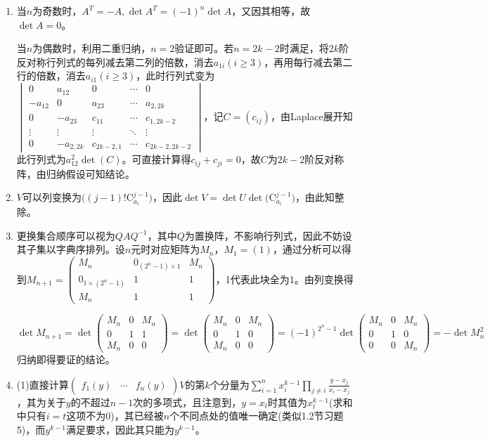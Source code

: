 \documentclass[a4paper,UTF8,fontset=windows]{ctexart}
\begin{document}
\begin{enumerate}
\item
当$n$为奇数时，$A^T=-A,\det{A^T}=(-1)^n\det{A}$，又因其相等，故$\det{A}=0$。

当$n$为偶数时，利用二重归纳，$n=2$验证即可。若$n=2k-2$时满足，将$2k$阶反对称行列式的每列减去第二列的倍数，消去$a_{1i}(i\ge3)$，再用每行减去第二行的倍数，消去$a_{i1}(i\ge3)$，此时行列式变为$\begin{vmatrix}0&a_{12}&0&\cdots&0\\-a_{12}&0&a_{23}&\cdots&a_{2,2k}\\0&-a_{23}&c_{11}&\cdots&c_{1,2k-2}\\\vdots&\vdots&\vdots&\ddots&\vdots\\0&-a_{2,2k}&c_{2k-2,1}&\cdots&c_{2k-2,2k-2}\end{vmatrix}$，记$C=(c_{ij})$，由Laplace展开知此行列式为$a_{12}^2\det(C)$。可直接计算得$c_{ij}+c_{ji}=0$，故$C$为$2k-2$阶反对称阵，由归纳假设可知结论。

\item
$V$可以列变换为$\big((j-1)!\mathrm{C}_{a_i}^{j-1}\big)$，因此$\det{V}=\det{U}\det{\big(\mathrm{C}_{a_i}^{j-1}\big)}$，由此知整除。

\item
更换集合顺序可以视为$QAQ^{-1}$，其中$Q$为置换阵，不影响行列式，因此不妨设其子集以字典序排列。设$n$元时对应矩阵为$M_n$，$M_1=(1)$，通过分析可以得到$M_{n+1}=\begin{pmatrix}M_n&0_{\left(2^n-1\right)\times1}&M_n\\0_{1\times\left(2^n-1\right)}&1&1\\M_n&1&1\end{pmatrix}$，1代表此块全为1。由列变换得

$\det{M_{n+1}}=\det{\begin{pmatrix}M_n&0&M_n\\0&1&1\\M_n&0&0\end{pmatrix}}=\det{\begin{pmatrix}M_n&0&M_n\\0&1&0\\M_n&0&0\end{pmatrix}}=(-1)^{2^n-1}\det{\begin{pmatrix}M_n&0&M_n\\0&1&0\\0&0&M_n\end{pmatrix}}=-\det{M_n^2}$
归纳即得要证的结论。

\item
(1)直接计算$\begin{pmatrix}f_1(y)&\cdots&f_n(y)\end{pmatrix}V$的第$k$个分量为$\sum_{i=1}^{n}{x_i^{k-1}\prod_{j\ne i}\frac{y-x_j}{x_i-x_j}}$，其为关于$y$的不超过$n-1$次的多项式，且注意到，$y=x_t$时其值为$x_t^{k-1}$(求和中只有$i=t$这项不为0)，其已经被$n$个不同点处的值唯一确定(类似1.2节习题5)，而$y^{k-1}$满足要求，因此其只能为$y^{k-1}$。


\end{enumerate}
\end{document}
